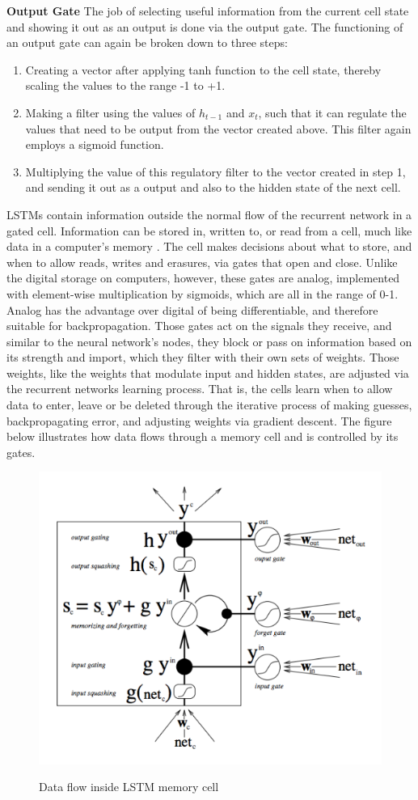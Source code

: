 \bigskip
\textbf{Output Gate}
The job of selecting useful information from the current cell state and showing it out as an output is done via the output gate. The functioning of an output gate can again be broken down to three steps:
\begin{enumerate}
    \item Creating a vector after applying tanh function to the cell state, thereby scaling the values to the range -1 to +1.
    \item Making a filter using the values of $h_{t-1}$ and $x_t$, such that it can regulate the values that need to be output from the vector created above. This filter again employs a sigmoid function.
    \item Multiplying the value of this regulatory filter to the vector created in step 1, and sending it out as a output and also to the hidden state of the next cell.
\end{enumerate}
\par LSTMs contain information outside the normal flow of the recurrent network in a gated cell. Information can be stored in, written to, or read from a cell, much like data in a computer’s memory \cite{franccois2017deep}. The cell makes decisions about what to store, and when to allow reads, writes and erasures, via gates that open and close. Unlike the digital storage on computers, however, these gates are analog, implemented with element-wise multiplication by sigmoids, which are all in the range of 0-1. Analog has the advantage over digital of being differentiable, and therefore suitable for backpropagation. Those gates act on the signals they receive, and similar to the neural network’s nodes, they block or pass on information based on its strength and import, which they filter with their own sets of weights. Those weights, like the weights that modulate input and hidden states, are adjusted via the recurrent networks learning process. That is, the cells learn when to allow data to enter, leave or be deleted through the iterative process of making guesses, backpropagating error, and adjusting weights via gradient descent. The figure below \cite{nicholson2019beginner} illustrates how data flows through a memory cell and is controlled by its gates.
\begin{figure}[h!]
\centering
\includegraphics[width=0.6\linewidth]{project/a.png}
\label{fig:felix}
\caption{Data flow inside LSTM memory cell}
\end{figure}
